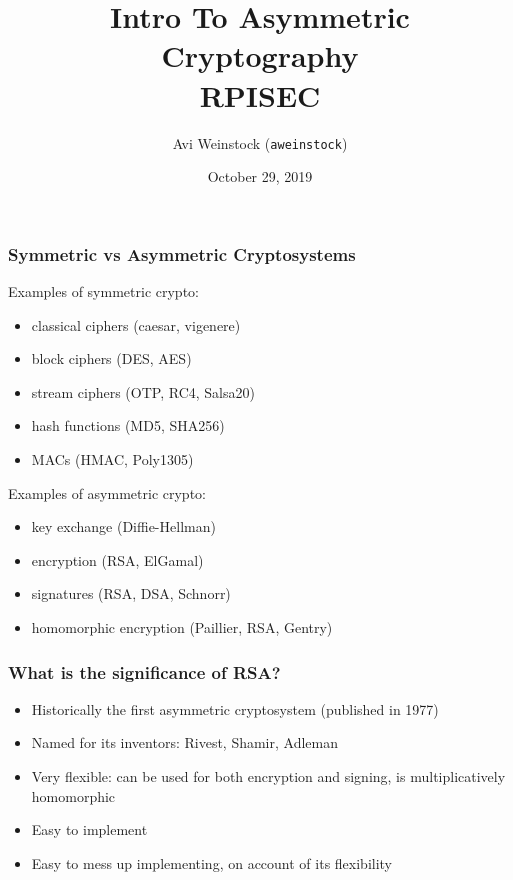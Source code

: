 \documentclass{beamer}
\title{Intro To Asymmetric Cryptography\\RPISEC}
\date{October 29, 2019}
\author{Avi Weinstock (\Verb|aweinstock|)}
\begin{document}
\maketitle


\begin{frame}[fragile]
\frametitle{Symmetric vs Asymmetric Cryptosystems}
\begin{minipage}[t]{0.45\textwidth}
Examples of symmetric crypto:
\begin{itemize}
\item classical ciphers (caesar, vigenere)
\item block ciphers (DES, AES)
\item stream ciphers (OTP, RC4, Salsa20)
\item hash functions (MD5, SHA256)
\item MACs (HMAC, Poly1305)
\end{itemize}
\end{minipage}
\begin{minipage}[t]{0.5\textwidth}
Examples of asymmetric crypto:
\begin{itemize}
\item key exchange (Diffie-Hellman)
\item encryption (RSA, ElGamal)
\item signatures (RSA, DSA, Schnorr)
\item homomorphic encryption (Paillier, RSA, Gentry)
\end{itemize}
\end{minipage}
\end{frame}

\begin{frame}[fragile]
\frametitle{What is the significance of RSA?}
\begin{itemize}
\item Historically the first asymmetric cryptosystem (published in 1977)
\item Named for its inventors: Rivest, Shamir, Adleman
\item Very flexible: can be used for both encryption and signing, is multiplicatively homomorphic
\item Easy to implement
\item Easy to mess up implementing, on account of its flexibility
\end{itemize}
\end{frame}
\end{document}
